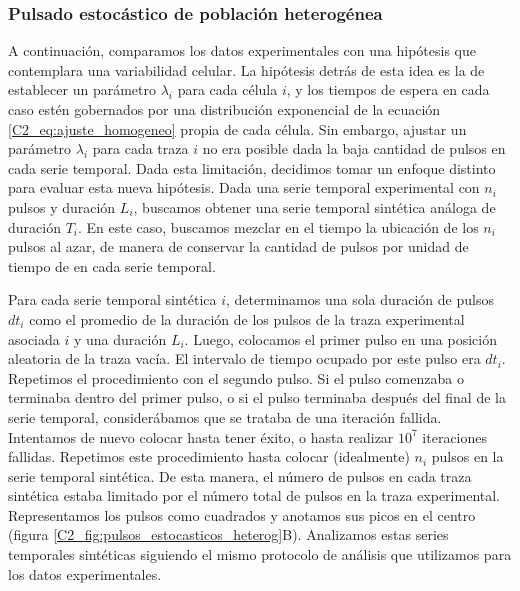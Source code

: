 \documentclass[./main.tex]{subfiles}
\begin{document}
\subsubsection*{Pulsado estocástico de población heterogénea}

A continuación, comparamos los datos experimentales con una hipótesis que contemplara una variabilidad celular. La hipótesis detrás de esta idea es la de establecer un parámetro $\lambda_i$ para cada célula $i$, y los tiempos de espera en cada caso estén gobernados por una distribución exponencial de la ecuación \ref{C2_eq:ajuste_homogeneo} propia de cada célula. Sin embargo, ajustar un parámetro  $\lambda_i$ para cada traza $i$ no era posible dada la baja cantidad de pulsos en cada serie temporal. Dada esta limitación, decidimos tomar un enfoque distinto para evaluar esta nueva hipótesis. Dada una serie temporal experimental con $n_i$ pulsos y duración $L_i$, buscamos obtener una serie temporal sintética análoga de duración $T_i$. En este caso, buscamos mezclar en el tiempo la ubicación de los $n_i$ pulsos al azar, de manera de conservar la cantidad de pulsos por unidad de tiempo de en cada serie temporal. 


Para cada serie temporal sintética $i$, determinamos una sola duración de pulsos $dt_i$ como el promedio de la duración de los pulsos de la traza experimental asociada $i$ y una duración $L_i$. Luego, colocamos el primer pulso en una posición aleatoria de la traza vacía. El intervalo de tiempo ocupado por este pulso era $dt_i$. Repetimos el procedimiento con el segundo pulso. Si el pulso comenzaba o terminaba dentro del primer pulso, o si el pulso terminaba después del final de la serie temporal, considerábamos que se trataba de una iteración fallida. Intentamos de nuevo colocar hasta tener éxito, o hasta realizar $10^{7}$ iteraciones fallidas. Repetimos este procedimiento hasta colocar (idealmente) $n_i$ pulsos en la serie temporal sintética. De esta manera, el número de pulsos en cada traza sintética estaba limitado por el número total de pulsos en la traza experimental. Representamos los pulsos como cuadrados y anotamos sus picos en el centro (figura \ref{C2_fig:pulsos_estocasticos_heterog}B). Analizamos estas series temporales sintéticas siguiendo el mismo protocolo de análisis que utilizamos para los datos experimentales. 
\end{document}
